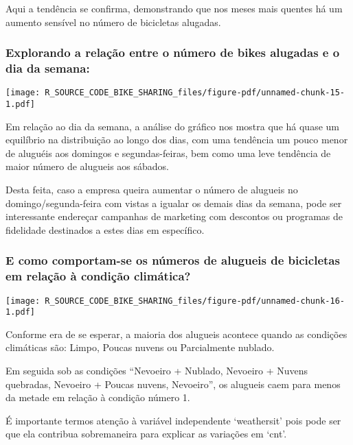 \documentclass[
  letterpaper,
  DIV=11,
  numbers=noendperiod]{scrartcl}
\begin{document}
Aqui a tendência se confirma, demonstrando que nos meses mais quentes há
um aumento sensível no número de bicicletas alugadas.

\subsubsection{Explorando a relação entre o número de bikes alugadas e o
dia da
semana:}\label{explorando-a-relauxe7uxe3o-entre-o-nuxfamero-de-bikes-alugadas-e-o-dia-da-semana}

\begin{center}
\texttt{[image: R\_SOURCE\_CODE\_BIKE\_SHARING\_files/figure-pdf/unnamed-chunk-15-1.pdf]}
\end{center}

Em relação ao dia da semana, a análise do gráfico nos mostra que há
quase um equilíbrio na distribuição ao longo dos dias, com uma tendência
um pouco menor de aluguéis aos domingos e segundas-feiras, bem como uma
leve tendência de maior número de alugueis aos sábados.

Desta feita, caso a empresa queira aumentar o número de alugueis no
domingo/segunda-feira com vistas a igualar os demais dias da semana,
pode ser interessante endereçar campanhas de marketing com descontos ou
programas de fidelidade destinados a estes dias em específico.

\subsubsection{E como comportam-se os números de alugueis de bicicletas
em relação à condição
climática?}\label{e-como-comportam-se-os-nuxfameros-de-alugueis-de-bicicletas-em-relauxe7uxe3o-uxe0-condiuxe7uxe3o-climuxe1tica}

\begin{center}
\texttt{[image: R\_SOURCE\_CODE\_BIKE\_SHARING\_files/figure-pdf/unnamed-chunk-16-1.pdf]}
\end{center}

Conforme era de se esperar, a maioria dos alugueis acontece quando as
condições climáticas são: Limpo, Poucas nuvens ou Parcialmente nublado.

Em seguida sob as condições ``Nevoeiro + Nublado, Nevoeiro + Nuvens
quebradas, Nevoeiro + Poucas nuvens, Nevoeiro'', os alugueis caem para
menos da metade em relação à condição número 1.

É importante termos atenção à variável independente `weathersit' pois
pode ser que ela contribua sobremaneira para explicar as variações em
`cnt'.
\end{document}
